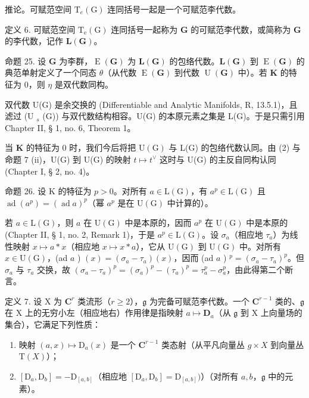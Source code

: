 推论。可赋范空间 \(\mathrm{T}_e(\mathrm{G})\) 连同括号一起是一个可赋范李代数。

定义 6. 可赋范空间 \(\mathrm{T_e(G)}\) 连同括号一起称为 \(\mathbf{G}\) 的可赋范李代数，或简称为 \(\mathbf{G}\) 的李代数，记作 \(\mathbf{L(G)}\)。

命题 25. 设 \(\mathbf{G}\) 为李群，\(\operatorname{E}(\mathbf{G})\) 为 \(\mathbf{L}(\mathbf{G})\) 的包络代数。\(\mathbf{L}(\mathbf{G})\) 到 \(\operatorname{E}(\mathbf{G})\) 的典范单射定义了一个同态 \(\theta\)（从代数 \(\operatorname{E}(\mathbf{G})\) 到代数 \(\operatorname{U}(\mathbf{G})\) 中）。若 \(\mathbf{K}\) 的特征为 \(0\)，则 \(\eta\) 是双代数同构。

双代数 U(G) 是余交换的 (Differentiable and Analytic Manifolds, R, 13.5.1)，且滤过 (U \(_{s}\) (G)) 与双代数结构相容。U(G) 的本原元素之集是 L(G)。于是只需引用 Chapter II, § 1, no. 6, Theorem 1。

当 \(\mathbf{K}\) 的特征为 0 时，我们今后将把 \(\mathrm{U}(\mathrm{G})\) 与 L(G) 的包络代数认同。由 (2) 与命题 7 (ii)，U(G) 到 U(G) 的映射 \(t \mapsto t^{\vee}\) 这时与 U(G) 的主反自同构认同 (Chapter I, § 2, no. 4)。

命题 26. 设 K 的特征为 \(p > 0\)。对所有 \(a \in \mathrm{L}(\mathrm{G})\)，有 \(a^p \in \mathrm{L}(\mathrm{G})\) 且 \(\operatorname{ad}(a^p) = (\operatorname{ad} a)^p\)（幂 \(a^p\) 是在 \(\mathrm{U}(\mathrm{G})\) 中计算的）。

若 \(a \in \mathrm{L}(\mathrm{G})\)，则 \(a\) 在 \(\mathrm{U}(\mathrm{G})\) 中是本原的，因而 \(a^p\) 在 \(\mathrm{U}(\mathrm{G})\) 中是本原的 (Chapter II, § 1, no. 2, Remark 1)，于是 \(a^p \in \mathrm{L}(\mathrm{G})\)。设 \(\sigma_a\)（相应地 \(\tau_a\)）为线性映射 \(x \mapsto a * x\)（相应地 \(x \mapsto x * a\)），它从 \(\mathrm{U}(\mathrm{G})\) 到 \(\mathrm{U}(\mathrm{G})\) 中。对所有 \(x \in \mathrm{U}(\mathrm{G})\)，(ad \(a\) ) \((x) = (\sigma_a - \tau_a)(x)\)，因而 (ad \(a\) ) \(^p = (\sigma_a - \tau_a)^p\)。但 \(\sigma_a\) 与 \(\tau_a\) 交换，故 \((\sigma_a - \tau_a)^p = (\sigma_a)^p - (\tau_a)^p = \tau_a^p - \sigma_a^p\)，由此得第二个断言。

定义 7. 设 X 为 \(\mathbf{C}^r\) 类流形（\(r \geqslant 2\)），\(\mathfrak{g}\) 为完备可赋范李代数。一个 \(\mathbf{C}^{r-1}\) 类的、\(\mathfrak{g}\) 在 X 上的无穷小左（相应地右）作用律是指映射 \(a \mapsto \mathbf{D}_a\)（从 \(\mathfrak{g}\) 到 X 上向量场的集合），它满足下列性质：

\begin{enumerate}
\def\labelenumi{(\alph{enumi})}
\item
  映射 \((a, x) \mapsto \mathrm{D}_a(x)\) 是一个 \(\mathbf{C}^{r-1}\) 类态射（从平凡向量丛 \(g \times X\) 到向量丛 \(\mathrm{T}(X)\)）；
\item
  \([\mathrm{D}_a,\mathrm{D}_b] = -\mathrm{D}_{[a,b]}\)（相应地 \([\mathrm{D}_a,\mathrm{D}_b] = \mathrm{D}_{[a,b]})\)）（对所有 \(a,b\)，\(\mathfrak{g}\) 中的元素）。
\end{enumerate}

